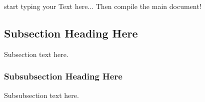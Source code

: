 
 start typing your Text here... Then compile the main document!

\subsection{Subsection Heading Here}
Subsection text here.

\subsubsection{Subsubsection Heading Here}
Subsubsection text here.